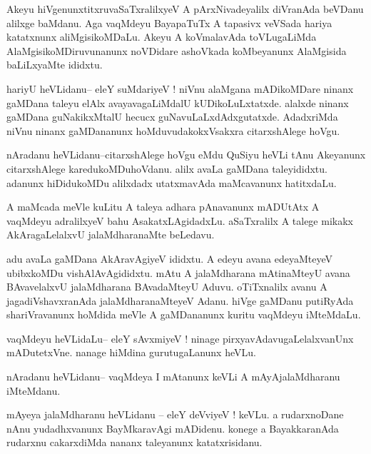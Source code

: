 \documentclass{article}
\begin{document}
\begin{mn}%
Akeyu hiVgenunxtitxruvaSaTxralilxyeV A pArxNivadeyalilx  diVranAda beVDanu alilxge baMdanu. 
Aga vaqMdeyu BayapaTuTx A tapasivx veVSada hariya katatxnunx aliMgisikoMDaLu. Akeyu A 
koVmalavAda toVLugaLiMda AlaMgisikoMDiruvunanunx noVDidare ashoVkada koMbeyanunx AlaMgisida 
baLiLxyaMte ididxtu.
\end{mn}

\begin{mn}%
hariyU heVLidanu-- eleY suMdariyeV ! niVnu alaMgana mADikoMDare ninanx gaMDana taleyu elAlx 
avayavagaLiMdalU kUDikoLuLxtatxde. alalxde ninanx gaMDana guNakikxMtalU hecucx 
guNavuLaLxdAdxgutatxde. AdadxriMda niVnu ninanx gaMDananunx hoMduvudakokxVsakxra 
citarxshAlege hoVgu.
\end{mn}

\begin{mn}%
nAradanu heVLidanu--citarxshAlege hoVgu eMdu QuSiyu heVLi tAnu Akeyanunx citarxshAlege 
karedukoMDuhoVdanu. alilx avaLa gaMDana taleyididxtu. adanunx hiDidukoMDu alilxdadx 
utatxmavAda maMcavanunx hatitxdaLu.
\end{mn}

\begin{mn}%
A maMcada meVle kuLitu A taleya adhara pAnavanunx mADUtAtx A vaqMdeyu adralilxyeV bahu 
AsakatxLAgidadxLu. aSaTxralilx A talege mikakx AkAragaLelalxvU jalaMdharanaMte beLedavu.
\end{mn}

\begin{mn}%
adu avaLa gaMDana AkAravAgiyeV ididxtu. A edeyu avana edeyaMteyeV ubibxkoMDu 
vishAlAvAgididxtu. mAtu A jalaMdharana mAtinaMteyU avana BAvavelalxvU jalaMdharana 
BAvadaMteyU Aduvu. oTiTxnalilx avanu A jagadiVshavxranAda jalaMdharanaMteyeV Adanu. hiVge 
gaMDanu putiRyAda shariVravanunx hoMdida meVle A gaMDananunx kuritu vaqMdeyu iMteMdaLu.
\end{mn}

\begin{mn}%
vaqMdeyu heVLidaLu-- eleY sAvxmiyeV ! ninage pirxyavAdavugaLelalxvanUnx mADutetxVne. nanage 
hiMdina gurutugaLanunx heVLu. 
\end{mn}

\begin{mn}%
nAradanu heVLidanu-- vaqMdeya I mAtanunx keVLi A mAyAjalaMdharanu iMteMdanu.
\end{mn}

\begin{mn}%
mAyeya jalaMdharanu heVLidanu -- eleY deVviyeV ! keVLu. a rudarxnoDane nAnu yudadhxvanunx 
BayMkaravAgi mADidenu. konege a BayakkaranAda rudarxnu cakarxdiMda nananx taleyanunx 
katatxrisidanu.
\end{mn}
\end{document}
